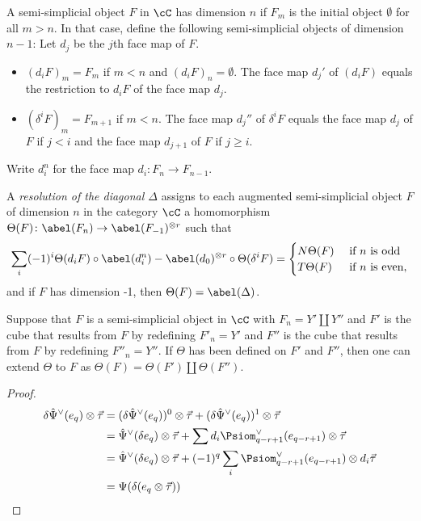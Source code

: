 A semi-simplicial object $F$ in $\cC$ has dimension $n$ if $F_m$ is the initial object $\emptyset$ for all $m>n$. In that case, define the following semi-simplicial objects of dimension $n-1$: Let $d_j$ be the $j$th face map of $F$.
\begin{itemize}
    \item $(d_iF)_m = F_m$ if $m<n$ and $(d_i F)_n = \emptyset$. The face map $d_j'$ of $(d_iF)$ equals the restriction to $d_iF$ of the face map $d_j$.
    \item $(\delta^iF)_m = F_{m+1}$ if $m<n$. The face map $d_j''$ of $\delta^i F$ equals the face map $d_j$ of $F$ if $j<i$ and the face map $d_{j+1}$ of $F$ if $j\geq i$.
\end{itemize} 
Write $d_i^n$ for the face map $d_i\colon F_n\to F_{n-1}$. 
\begin{definition}
    A \emph{resolution of the diagonal $\Delta$} assigns to each augmented semi-simplicial object $F$ of dimension $n$ in the category $\cC$ a homomorphism $\Theta(F)\colon \abel(F_n)\to \abel(F_{-1})^{\otimes r}$ such that
    \[
        \sum_i (-1)^i\Theta(d_iF)\circ \abel(d_i^n) - \abel(d_0)^{\otimes r}\circ\Theta(\delta^iF) = \begin{cases}
        N\Theta(F) & \text{ if $n$ is odd} \\
        T\Theta(F) & \text{ if $n$ is even},
        \end{cases}
    \]
    and if $F$ has dimension -1, then $\Theta(F) = \abel(\Delta)$.
\end{definition}
\begin{remark}
    Suppose that $F$ is a semi-simplicial object in $\cC$ with $F_n = Y'\amalg Y''$ and $F'$ is the cube that results from $F$ by redefining $F'_n = Y'$ and $F''$ is the cube that results from $F$ by redefining $F''_n = Y''$. If $\Theta$ has been defined on $F'$ and $F''$, then one can extend $\Theta$ to $F$ as $\Theta(F) = \Theta(F')\amalg \Theta(F'')$.
\end{remark}



\begin{proof}
	\begin{align*}
		\delta\hat{\Psi}^{\vee}(e_q)\otimes \vec{\tau}
		&= (\delta\hat{\Psi}^{\vee}(e_q))^{0}\otimes\vec{\tau} + (\delta\hat{\Psi}^{\vee}(e_q))^{1}\otimes\vec{\tau} \\
		&= \hat{\Psi}^{\vee}(\delta e_q)\otimes \vec{\tau} + \sum d_i\Psiom^\vee_{q-r+1}(e_{q-r+1})\otimes\vec{\tau} \\
		&= \hat{\Psi}^{\vee}(\delta e_q)\otimes \vec{\tau} + (-1)^q\sum_i \Psiom^\vee_{q-r+1}(e_{q-r+1})\otimes d_i\vec{\tau} \\
		&= \Psi(\delta(e_q\otimes \vec{\tau}))\qedhere
	\end{align*}
\end{proof}

